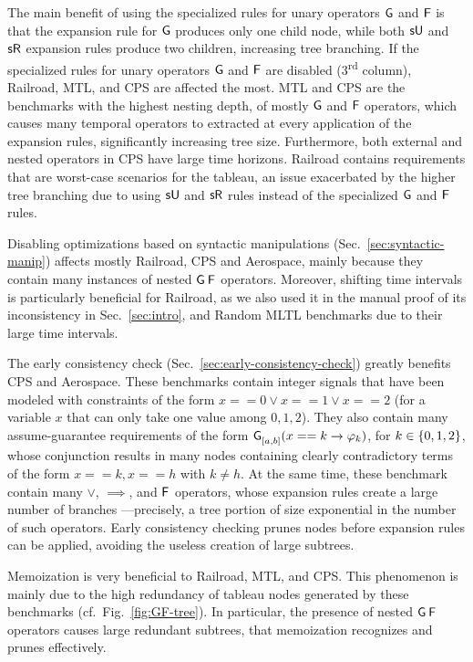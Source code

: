 \documentclass[acmsmall,screen]{acmart}
\begin{document}
The main benefit of using the specialized rules for unary operators $\mathsf{G}$ and $\mathsf{F}$
is that the expansion rule for $\mathsf{G}$ produces only one child node,
while both $\mathsf{sU}$ and $\mathsf{sR}$ expansion rules produce two children,
increasing tree branching.
If the specialized rules for unary operators $\mathsf{G}$ and $\mathsf{F}$ are disabled (3\textsuperscript{rd} column), Railroad, MTL, and CPS are affected the most.
MTL and CPS are the benchmarks with the highest nesting depth, of mostly $\mathsf{G}$ and $\mathsf{F}$ operators,
which causes many temporal operators to extracted at every application of the expansion rules,
significantly increasing tree size.
Furthermore, both external and nested operators in CPS have large time horizons.
Railroad contains requirements that are worst-case scenarios for the tableau,
an issue exacerbated by the higher tree branching due to using $\mathsf{sU}$ and $\mathsf{sR}$ rules
instead of the specialized $\mathsf{G}$ and $\mathsf{F}$ rules.

Disabling optimizations based on syntactic manipulations (Sec.~\ref{sec:syntactic-manip})
affects mostly Railroad, CPS and Aerospace, mainly because they contain many instances of nested $\mathop{\mathsf{\mathsf{G}}^{{}}_{}}\mathop{\mathsf{\mathsf{F}}^{{}}_{}}$ operators.
Moreover, shifting time intervals is particularly beneficial for Railroad,
as we also used it in the manual proof of its inconsistency in Sec.~\ref{sec:intro},
and Random MLTL benchmarks due to their large time intervals.

The early consistency check (Sec.~\ref{sec:early-consistency-check}) greatly benefits CPS and Aerospace.
These benchmarks contain integer signals
that have been modeled with constraints of the form $x == 0 \lor x == 1 \lor x==2$
(for a variable $x$ that can only take one value among $0, 1, 2$).
They also contain many assume-guarantee requirements of the form
$\mathop{\mathsf{\mathsf{G}}^{{}}_{[a,b]}} (x == k \rightarrow \varphi_k)$, for $k \in \{ 0,1,2 \}$,
whose conjunction results in many nodes containing clearly contradictory terms of the form $x == k, x == h$ with $k \neq h$.
At the same time, these benchmark contain many $\lor$, $\implies$, and $\mathop{\mathsf{\mathsf{F}}^{{}}_{}}$ operators,
whose expansion rules create a large number of branches%
---precisely, a tree portion of size exponential in the number of such operators.
Early consistency checking prunes nodes before expansion rules can be applied,
avoiding the useless creation of large subtrees.

Memoization is very beneficial to Railroad, MTL, and CPS.
This phenomenon is mainly due to the high redundancy of tableau nodes generated by these benchmarks (cf.\ Fig.~\ref{fig:GF-tree}).
In particular, the presence of nested $\mathop{\mathsf{\mathsf{G}}^{{}}_{}}\mathop{\mathsf{\mathsf{F}}^{{}}_{}}$ operators causes large redundant subtrees,
that memoization recognizes and prunes effectively.
\end{document}
